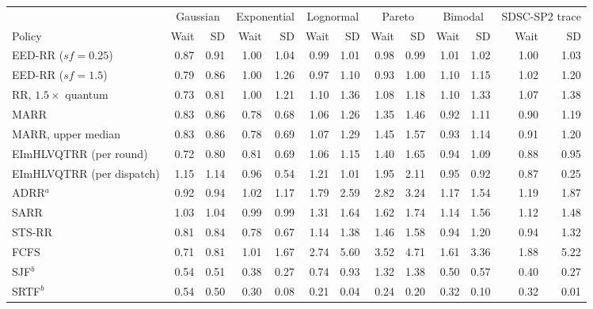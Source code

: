 \begin{tabular}{lrrrrrrrrrrrr}
\toprule
 & \multicolumn{2}{c}{Gaussian} & \multicolumn{2}{c}{Exponential} & \multicolumn{2}{c}{Lognormal} & \multicolumn{2}{c}{Pareto} & \multicolumn{2}{c}{Bimodal} & \multicolumn{2}{c}{SDSC-SP2 trace} \\
\cmidrule(lr){2-3} \cmidrule(lr){4-5} \cmidrule(lr){6-7} \cmidrule(lr){8-9} \cmidrule(lr){10-11} \cmidrule(lr){12-13}
Policy & Wait & SD & Wait & SD & Wait & SD & Wait & SD & Wait & SD & Wait & SD \\
\midrule
EED-RR ($sf=0.25$) & 0.87 & 0.91 & 1.00 & 1.04 & 0.99 & 1.01 & 0.98 & 0.99 & 1.01 & 1.02 & 1.00 & 1.03 \\
EED-RR ($sf=1.5$) & 0.79 & 0.86 & 1.00 & 1.26 & 0.97 & 1.10 & 0.93 & 1.00 & 1.10 & 1.15 & 1.02 & 1.20 \\
RR, $1.5\times$ quantum & 0.73 & 0.81 & 1.00 & 1.21 & 1.10 & 1.36 & 1.08 & 1.18 & 1.10 & 1.33 & 1.07 & 1.38 \\
MARR & 0.83 & 0.86 & 0.78 & 0.68 & 1.06 & 1.26 & 1.35 & 1.46 & 0.92 & 1.11 & 0.90 & 1.19 \\
MARR, upper median & 0.83 & 0.86 & 0.78 & 0.69 & 1.07 & 1.29 & 1.45 & 1.57 & 0.93 & 1.14 & 0.91 & 1.20 \\
EImHLVQTRR (per round) & 0.72 & 0.80 & 0.81 & 0.69 & 1.06 & 1.15 & 1.40 & 1.65 & 0.94 & 1.09 & 0.88 & 0.95 \\
EImHLVQTRR (per dispatch) & 1.15 & 1.14 & 0.96 & 0.54 & 1.21 & 1.01 & 1.95 & 2.11 & 0.95 & 0.92 & 0.87 & 0.25 \\
ADRR$^{a}$ & 0.92 & 0.94 & 1.02 & 1.17 & 1.79 & 2.59 & 2.82 & 3.24 & 1.17 & 1.54 & 1.19 & 1.87 \\
SARR & 1.03 & 1.04 & 0.99 & 0.99 & 1.31 & 1.64 & 1.62 & 1.74 & 1.14 & 1.56 & 1.12 & 1.48 \\
STS-RR & 0.81 & 0.84 & 0.78 & 0.67 & 1.14 & 1.38 & 1.46 & 1.58 & 0.94 & 1.20 & 0.94 & 1.32 \\
FCFS & 0.71 & 0.81 & 1.01 & 1.67 & 2.74 & 5.60 & 3.52 & 4.71 & 1.61 & 3.36 & 1.88 & 5.22 \\
SJF$^{b}$ & 0.54 & 0.51 & 0.38 & 0.27 & 0.74 & 0.93 & 1.32 & 1.38 & 0.50 & 0.57 & 0.40 & 0.27 \\
SRTF$^{b}$ & 0.54 & 0.50 & 0.30 & 0.08 & 0.21 & 0.04 & 0.24 & 0.20 & 0.32 & 0.10 & 0.32 & 0.01 \\
\bottomrule
\end{tabular}
